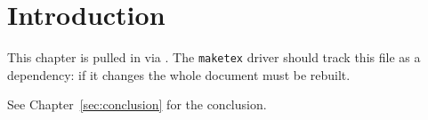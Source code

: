 \section{Introduction}
\label{sec:intro}

This chapter is pulled in via \verb||. The
\texttt{maketex} driver should track this file as a dependency: if it changes
the whole document must be rebuilt.

See Chapter~\ref{sec:conclusion} for the conclusion.
